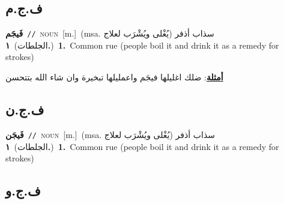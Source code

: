 \documentclass[10pt,a4paper,twoside]{article} %
\begin{document}
\begin{multicols}{2}
\vspace{-3mm}
\subsection*{\color{blue}\foreignlanguage{arabic}{ف.ج.م}\color{blue}{ (ntws)}} 

{\setlength\topsep{0pt}\textbf{\foreignlanguage{arabic}{فَيجَم}}\ {\color{gray}\texttt{//}\color{black}}\ \textsc{noun}\ [m.]\ \color{gray}(msa. \foreignlanguage{arabic}{سذاب أذفر (يُغْلى ويُشْرَب لعلاج الجلطات)}~\foreignlanguage{arabic}{\textbf{١.}})\color{black}\ \textbf{1.}~Common rue (people boil it and drink it as a remedy for strokes)\  \begin{flushright}\color{gray}\foreignlanguage{arabic}{\textbf{\underline{\foreignlanguage{arabic}{أمثلة}}}: ضلك اغليلها فيجَم واعمليلها تبخيرة وان شاء الله بتتحسن}\end{flushright}\color{black}} \vspace{2mm}

\vspace{-3mm}
\subsection*{\color{blue}\foreignlanguage{arabic}{ف.ج.ن}\color{blue}{ (ntws)}} 

{\setlength\topsep{0pt}\textbf{\foreignlanguage{arabic}{فَيجَن}}\ {\color{gray}\texttt{//}\color{black}}\ \textsc{noun}\ [m.]\ \color{gray}(msa. \foreignlanguage{arabic}{سذاب أذفر (يُغْلى ويُشْرَب لعلاج الجلطات)}~\foreignlanguage{arabic}{\textbf{١.}})\color{black}\ \textbf{1.}~Common rue (people boil it and drink it as a remedy for strokes)\ } \vspace{2mm}

\vspace{-3mm}
\subsection*{\color{blue}\foreignlanguage{arabic}{ف.ج.و}\color{blue}{}} 


\end{multicols}
\end{document}
